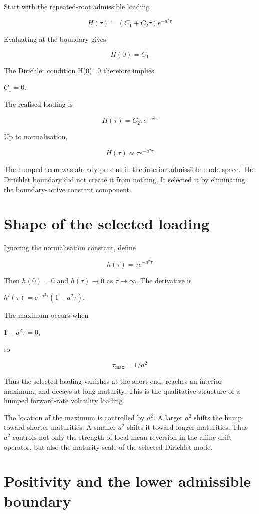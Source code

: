 \documentclass[11pt,oneside]{book}
\begin{document}
Start with the repeated-root admissible loading

\[
H(\tau)=(C_1+C_2\tau)e^{-a^2\tau}
\]

Evaluating at the boundary gives

\[
H(0)=C_1
\]

The Dirichlet condition H(0)=0 therefore implies

$C_1=0$.

The realised loading is

\[
H(\tau)=C_2\tau e^{-a^2\tau}
\]

Up to normalisation,

\[
H(\tau)\propto\tau e^{-a^2\tau}
\]

The humped term was already present in the interior admissible mode
space. The Dirichlet boundary did not create it from nothing. It
selected it by eliminating the boundary-active constant component.

\section{Shape of the selected
loading}\label{shape-of-the-selected-loading}

Ignoring the normalisation constant, define

\[
h(\tau)=\tau e^{-a^2\tau}
\]

Then $h(0)=0$ and $h(\tau)\to0$ as $\tau\to\infty$. The derivative is

$h'(\tau)=e^{-a^2\tau}(1-a^2\tau)$.

The maximum occurs when

$1-a^2\tau=0$,

so

\[
\tau_{\max}=1/a^2
\]

Thus the selected loading vanishes at the short end, reaches an interior
maximum, and decays at long maturity. This is the qualitative structure
of a humped forward-rate volatility loading.

The location of the maximum is controlled by $a^2$. A larger $a^2$ shifts the
hump toward shorter maturities. A smaller $a^2$ shifts it toward longer
maturities. Thus $a^2$ controls not only the strength of local mean
reversion in the affine drift operator, but also the maturity scale of
the selected Dirichlet mode.

\section{Positivity and the lower admissible
boundary}\label{positivity-and-the-lower-admissible-boundary}
\end{document}
